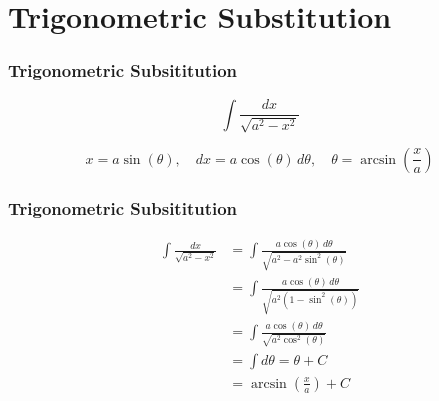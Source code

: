 \documentclass{beamer}
\begin{document}
\section*{Trigonometric Substitution}
\begin{frame}
	\frametitle{Trigonometric Subsititution}
\[\int\frac{dx}{\sqrt{a^2-x^2}}\]

\[x=a\sin(\theta),\quad dx=a\cos(\theta)\,d\theta, \quad \theta=\arcsin\left(\frac{x}{a}\right)\]
\end{frame}
\begin{frame}
	\frametitle{Trigonometric Subsititution}
{\large
	\begin{eqnarray}
	\int\frac{dx}{\sqrt{a^2-x^2}} & = \int\frac{a\cos(\theta)\,d\theta}{\sqrt{a^2-a^2\sin^2(\theta)}}\\ \nonumber &= \int\frac{a\cos(\theta)\,d\theta}{\sqrt{a^2(1-\sin^2(\theta))}} \\ \nonumber
	& = \int\frac{a\cos(\theta)\,d\theta}{\sqrt{a^2\cos^2(\theta)}} \\ &= \int d\theta=\theta+C \\ \nonumber &=\arcsin\left(\frac{x}{a}\right)+C
	\end{eqnarray}
}
\end{frame}
\end{document}
